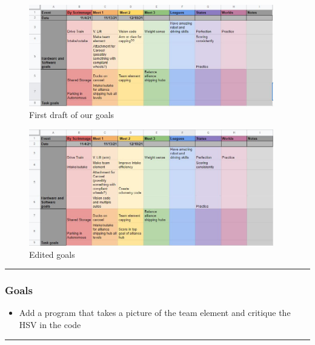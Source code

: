 \begin{figure}[htp]
\centering
\includegraphics[width=0.95\textwidth, angle=0]{Meetings/November/11-02-21/11-2-21_Team_Figure1 - Nathan Forrer.JPG}
\caption{First draft of our goals}
\label{fig:110221_1}
\end{figure}
 

\begin{figure}[htp]
\centering
\includegraphics[width=0.95\textwidth, angle=0]{Meetings/November/11-02-21/11-2-21_Team_Figure2 - Nathan Forrer.JPG}
\caption{Edited goals}
\label{fig:110221_2}
\end{figure}

\noindent\hfil\rule{\textwidth}{.4pt}\hfil
\subsubsection*{Goals}
\begin{itemize}
    \item Add a program that takes a picture of the team element and critique the HSV in the code

\end{itemize} 

\noindent\hfil\rule{\textwidth}{.4pt}\hfil


